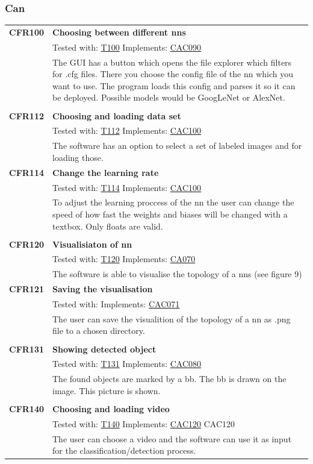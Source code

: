 \documentclass[parskip=full]{scrartcl}
\begin{document}
\subsubsection{Can}
\begin{tabular}{p{2cm}p{11.4cm}}
\textbf{CFR100} \hypertarget{CFR100} & \textbf{Choosing between different \glspl{nn}}\\
& Tested with: \hyperlink{T100}{T100} Implements: \hyperlink{CAC090}{CAC090} \\
& The GUI has a button which opens the file explorer which filters for .cfg files. There you choose the config file of the \gls{nn} which you want to use. The program loads this config and parses it so it can be deployed. Possible models would be GoogLeNet or AlexNet.\\
& \\
\textbf {CFR112} \hypertarget{CFR112} & \textbf{Choosing and loading data set} \\
& Tested with: \hyperlink{T112}{T112} Implements: \hyperlink{CAC100}{CAC100}\\
& The software has an option to select a set of labeled images and for loading those.\\
\textbf {CFR114} \hypertarget{CFR114} & \textbf{Change the learning rate} \\
& Tested with: \hyperlink{T114}{T114} Implements: \hyperlink{CAC100}{CAC100} \\
& To adjust the learning proccess of the \gls{nn} the user can change the speed of how fast the weights and biases will be changed with a textbox. Only floats are valid.\\
& \\
\textbf {CFR120} \hypertarget{CFR120} & \textbf{Visualisiaton of \gls{nn}} \\
& Tested with: \hyperlink{T120}{T120} Implements: \hyperlink{CA070}{CA070} \\
& The software is able to visualise the topology of a \glspl{nn} (see figure 9) \\
\textbf{CFR121} \hypertarget{CFR121} & \textbf{Saving the visualisation}\\
& Tested with: Implements: \hyperlink{CAC071}{CAC071} \\
& The user can save the visualition of the topology of a \gls{nn} as .png file to a chosen directory.\\
& \\
\textbf {CFR131} \hypertarget{CFR131} & \textbf{Showing detected object} \\
& Tested with: \hyperlink{T131}{T131} Implements: \hyperlink{CAC080}{CAC080}\\
& The found objects are marked by a \gls{bb}. The \gls{bb} is drawn on the image. This picture is shown.\\
& \\
\textbf{CFR140} \hypertarget{CFR140} & \textbf{Choosing and loading video}\\
& Tested with: \hyperlink{T140}{T140} Implements: \hyperlink{CAC120}{CAC120} CAC120 \\
& The user can choose a video and the software can use it as input for the classification/detection process.\\
\end{tabular}
\end{document}
